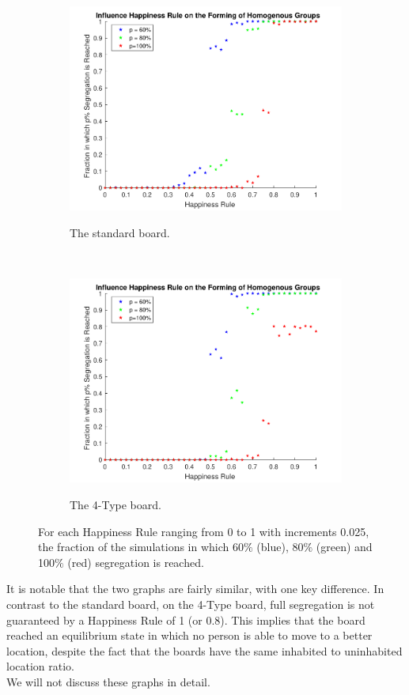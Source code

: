 \begin{figure}[H]
	\centering
	\begin{subfigure}{0.4\textwidth}
    \includegraphics[width=\textwidth]{happy_segr_60_80_100.pdf}
    \label{fig:happysegsc}
    \caption{The standard board.}
    \end{subfigure}
    ~
    \begin{subfigure}{0.4\textwidth}
    \includegraphics[width=\textwidth]{happy_segr_60_80_100_4b.pdf}
    \label{fig:happyseg4c}
    \caption{The 4-Type board.}
    \end{subfigure}
    \caption{For each Happiness Rule ranging from 0 to 1 with increments 0.025, the fraction of the simulations in which 60$\%$ (blue), 80$\%$ (green) and 100$\%$ (red) segregation is reached.}
    \label{fig:happysegr}
\end{figure}
It is notable that the two graphs are fairly similar, with one key difference. In contrast to the standard board, on the 4-Type board, full segregation is not guaranteed by a Happiness Rule of 1 (or 0.8). This implies that the board reached an equilibrium state in which no person is able to move to a better location, despite the fact that the boards have the same inhabited to uninhabited location ratio.\\
We will not discuss these graphs in detail.

